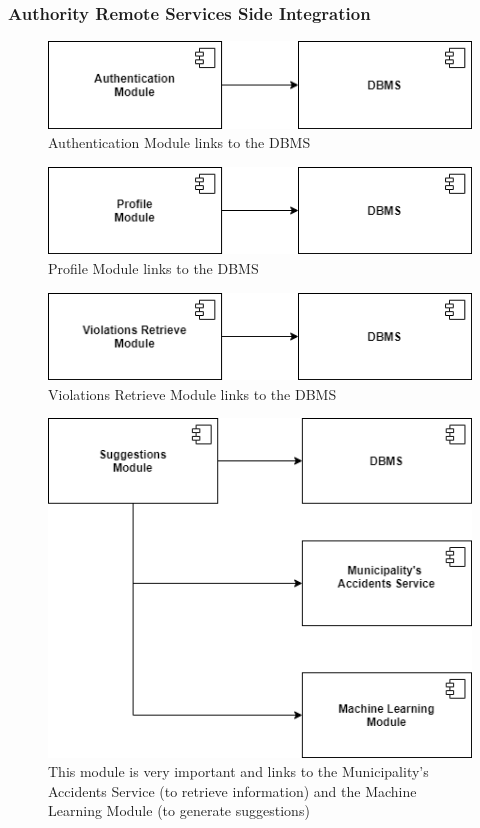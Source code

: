 \documentclass[12pt,a4paper]{article}
\begin{document}
\subsubsection{Authority Remote Services Side Integration}
\begin{figure}[H]
		\centering
		\includegraphics[width=0.5\linewidth]{../assets/images/auth_mod_auth_serv.png}
		\caption{Authentication Module links to the DBMS}
\end{figure}
\begin{figure}[H]
		\centering
		\includegraphics[width=0.5\linewidth]{../assets/images/prof_mod_auth_serv.png}
		\caption{Profile Module links to the DBMS}
\end{figure}
\begin{figure}[H]
		\centering
		\includegraphics[width=0.5\linewidth]{../assets/images/viol_retr_serv.png}
		\caption{Violations Retrieve Module links to the DBMS}
\end{figure}
\begin{figure}[H]
		\centering
		\includegraphics[width=0.5\linewidth]{../assets/images/sugg_mod_auth.png}
		\caption{This module is very important and links to the Municipality's Accidents Service (to retrieve information) and the Machine Learning Module (to generate suggestions)}
\end{figure}
\end{document}
